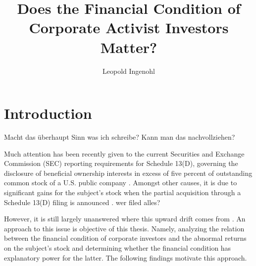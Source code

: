 \documentclass[12pt]{article}
\title{Does the Financial Condition of Corporate Activist Investors Matter?}
\author{Leopold Ingenohl}
\begin{document}
\maketitle

\pagebreak


\section{Introduction}

\begin{center}
	Macht das überhaupt Sinn was ich schreibe? Kann man das nachvollziehen? 
\end{center}
Much attention has been recently given to the current Securities and Exchange Commission (SEC) reporting requirements for Schedule 13(D), governing the disclosure of beneficial ownership interests in excess of five percent of outstanding common stock of a U.S. public company \citep{Giglia2018}. Amongst other causes, it is due to significant gains for the subject's stock when the partial acquisition through a Schedule 13(D) filing is announced \citep{Akhigbe2007}. wer filed alles? 



However, it is still largely unanswered where this upward drift comes from \citep{Greenwood2009}. An approach to this issue is objective of this thesis. Namely, analyzing the relation between the financial condition of corporate investors and the abnormal returns on the subject's stock and determining whether the financial condition has explanatory power for the latter. The following findings motivate this approach.  
\end{document}
